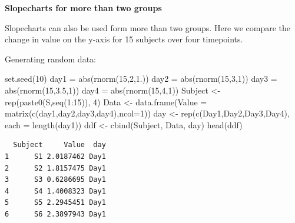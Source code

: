 \documentclass[
  letterpaper,
  DIV=11,
  numbers=noendperiod]{scrreprt}
\newenvironment{Shaded}{\begin{snugshade}}{\end{snugshade}}
\newcommand{\AttributeTok}[1]{\textcolor[rgb]{0.40,0.45,0.13}{#1}}
\newcommand{\DecValTok}[1]{\textcolor[rgb]{0.68,0.00,0.00}{#1}}
\newcommand{\FloatTok}[1]{\textcolor[rgb]{0.68,0.00,0.00}{#1}}
\newcommand{\FunctionTok}[1]{\textcolor[rgb]{0.28,0.35,0.67}{#1}}
\newcommand{\NormalTok}[1]{\textcolor[rgb]{0.00,0.23,0.31}{#1}}
\newcommand{\OtherTok}[1]{\textcolor[rgb]{0.00,0.23,0.31}{#1}}
\newcommand{\SpecialCharTok}[1]{\textcolor[rgb]{0.37,0.37,0.37}{#1}}
\newcommand{\StringTok}[1]{\textcolor[rgb]{0.13,0.47,0.30}{#1}}
\begin{document}
\textbf{Slopecharts for more than two groups}

Slopecharts can also be used form more than two groups. Here we compare
the change in value on the y-axis for 15 subjects over four timepoints.

Generating random data:

\begin{Shaded}
\begin{Highlighting}[]
\FunctionTok{set.seed}\NormalTok{(}\DecValTok{10}\NormalTok{) }
\NormalTok{day1 }\OtherTok{=} \FunctionTok{abs}\NormalTok{(}\FunctionTok{rnorm}\NormalTok{(}\DecValTok{15}\NormalTok{,}\DecValTok{2}\NormalTok{,}\FloatTok{1.}\NormalTok{))}
\NormalTok{day2 }\OtherTok{=} \FunctionTok{abs}\NormalTok{(}\FunctionTok{rnorm}\NormalTok{(}\DecValTok{15}\NormalTok{,}\DecValTok{3}\NormalTok{,}\DecValTok{1}\NormalTok{))}
\NormalTok{day3 }\OtherTok{=} \FunctionTok{abs}\NormalTok{(}\FunctionTok{rnorm}\NormalTok{(}\DecValTok{15}\NormalTok{,}\FloatTok{3.5}\NormalTok{,}\DecValTok{1}\NormalTok{))}
\NormalTok{day4 }\OtherTok{=} \FunctionTok{abs}\NormalTok{(}\FunctionTok{rnorm}\NormalTok{(}\DecValTok{15}\NormalTok{,}\DecValTok{4}\NormalTok{,}\DecValTok{1}\NormalTok{))}
\NormalTok{Subject }\OtherTok{\textless{}{-}} \FunctionTok{rep}\NormalTok{(}\FunctionTok{paste0}\NormalTok{(}\StringTok{\textquotesingle{}S\textquotesingle{}}\NormalTok{,}\FunctionTok{seq}\NormalTok{(}\DecValTok{1}\SpecialCharTok{:}\DecValTok{15}\NormalTok{)), }\DecValTok{4}\NormalTok{)}
\NormalTok{Data }\OtherTok{\textless{}{-}} \FunctionTok{data.frame}\NormalTok{(}\AttributeTok{Value =} \FunctionTok{matrix}\NormalTok{(}\FunctionTok{c}\NormalTok{(day1,day2,day3,day4),}\AttributeTok{ncol=}\DecValTok{1}\NormalTok{))}
\NormalTok{day }\OtherTok{\textless{}{-}} \FunctionTok{rep}\NormalTok{(}\FunctionTok{c}\NormalTok{(}\StringTok{\textquotesingle{}Day1\textquotesingle{}}\NormalTok{,}\StringTok{\textquotesingle{}Day2\textquotesingle{}}\NormalTok{,}\StringTok{\textquotesingle{}Day3\textquotesingle{}}\NormalTok{,}\StringTok{\textquotesingle{}Day4\textquotesingle{}}\NormalTok{), }\AttributeTok{each =} \FunctionTok{length}\NormalTok{(day1))}
\NormalTok{ddf }\OtherTok{\textless{}{-}} \FunctionTok{cbind}\NormalTok{(Subject, Data, day)}
\FunctionTok{head}\NormalTok{(ddf)}
\end{Highlighting}
\end{Shaded}

\begin{verbatim}
  Subject     Value  day
1      S1 2.0187462 Day1
2      S2 1.8157475 Day1
3      S3 0.6286695 Day1
4      S4 1.4008323 Day1
5      S5 2.2945451 Day1
6      S6 2.3897943 Day1
\end{verbatim}
\end{document}
